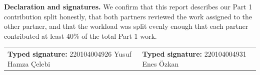 \documentclass[10pt,a4paper]{article}
\begin{document}
\normalsize
\vspace{7pt}
\textbf{Declaration and signatures.}
We confirm that this report describes our Part 1 contribution split honestly, that both partners reviewed the work assigned to the other partner, and that the workload was split evenly enough that each partner contributed at least 40\% of the total Part 1 work.

\vspace{7pt}
\begin{tabularx}{\textwidth}{@{} X X @{}}
\textbf{Typed signature:} 220104004926 Yusuf Hamza Çelebi &
\textbf{Typed signature:} 220104004931 Enes Özkan \\
\end{tabularx}
\end{document}
